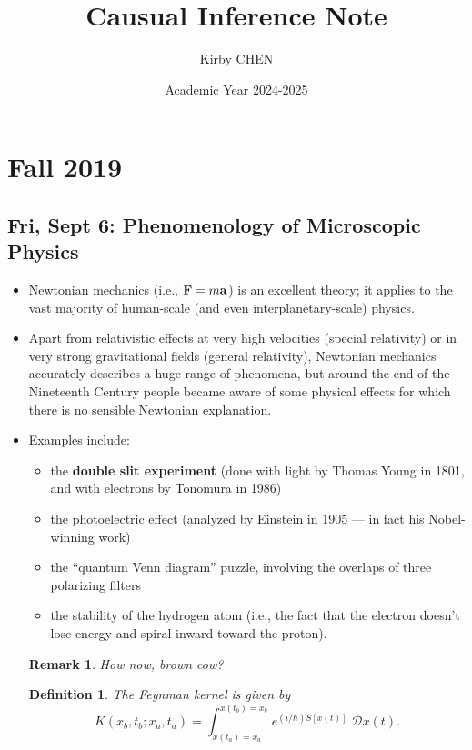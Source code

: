 \documentclass[10pt, oneside]{article}
\title{Causual Inference Note}
\author{Kirby CHEN}
\date{Academic Year 2024-2025}
\newtheorem{defn}{Definition}
\newtheorem{rem}{Remark}
\begin{document}
\maketitle
\tableofcontents

\vspace{.25in}

\section{Fall 2019}

\subsection{Fri, Sept 6: Phenomenology of Microscopic Physics}

\begin{itemize}

\item Newtonian mechanics (i.e., ${\bf F} = m{\bf a}$) is an excellent theory; it applies to the vast majority of human-scale (and even interplanetary-scale) physics. 

\item Apart from relativistic effects at very high velocities (special relativity) or in very strong gravitational fields (general relativity), Newtonian mechanics accurately describes a huge range of phenomena, but around the end of the Nineteenth Century people became aware of some physical effects for which there is no sensible Newtonian explanation.

\item Examples include:
\begin{itemize}
\item the {\bf double slit experiment} (done with light by Thomas Young in 1801, and with electrons by Tonomura in 1986)
\item the photoelectric effect (analyzed by Einstein in 1905 --- in fact his Nobel-winning work)
\item the ``quantum Venn diagram'' puzzle, involving the overlaps of three polarizing filters
\item the stability of the hydrogen atom (i.e., the fact that the electron doesn't lose energy and spiral inward toward the proton).
\end{itemize}

\begin{rem}
How now, brown cow?
\end{rem}

\begin{defn}
The {\em Feynman kernel} is given by
\[ K(x_b, t_b; x_a, t_a) = \int_{x(t_a) = x_a}^{x(t_b) = x_b} e^{(i/\hbar) S[x(t)]} \; \mathcal{D}x(t). \]
\end{defn}

\end{itemize}
\end{document}
